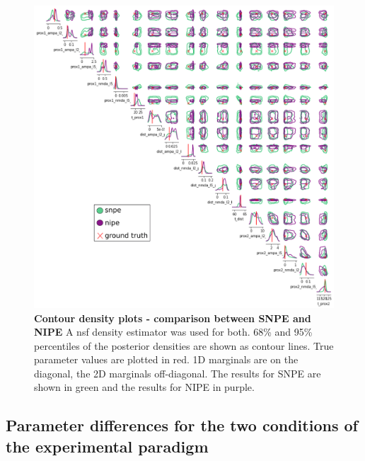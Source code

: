 \documentclass[12pt]{extreport}
\begin{document}
 \begin{figure}
 \centering


        \includegraphics[width=0.99\linewidth]{images/thesis_fig4_10com_snpe_nipe_purple_green_label.png}


\caption{\label{contour_nipe_snpe}\textbf{Contour density plots - comparison between SNPE and NIPE} \small A nsf density estimator was used for both. 68\% and 95\% percentiles of the posterior densities are shown as contour lines. True parameter values are plotted in red. 1D marginals are on the diagonal, the 2D marginals off-diagonal. The results for SNPE are shown in green and the results for NIPE in purple.}

\end{figure}

\subsection{Parameter differences for the two conditions of the experimental paradigm}
\end{document}
